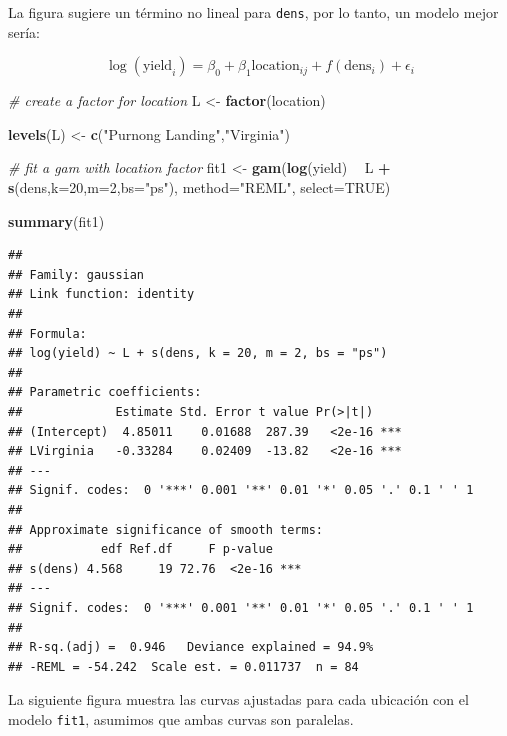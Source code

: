 \documentclass[]{book}
\newenvironment{Shaded}{\begin{snugshade}}{\end{snugshade}}
\newcommand{\KeywordTok}[1]{\textcolor[rgb]{0.13,0.29,0.53}{\textbf{#1}}}
\newcommand{\DataTypeTok}[1]{\textcolor[rgb]{0.13,0.29,0.53}{#1}}
\newcommand{\DecValTok}[1]{\textcolor[rgb]{0.00,0.00,0.81}{#1}}
\newcommand{\StringTok}[1]{\textcolor[rgb]{0.31,0.60,0.02}{#1}}
\newcommand{\CommentTok}[1]{\textcolor[rgb]{0.56,0.35,0.01}{\textit{#1}}}
\newcommand{\OtherTok}[1]{\textcolor[rgb]{0.56,0.35,0.01}{#1}}
\newcommand{\OperatorTok}[1]{\textcolor[rgb]{0.81,0.36,0.00}{\textbf{#1}}}
\newcommand{\NormalTok}[1]{#1}
\begin{document}
La figura sugiere un término no lineal para \texttt{dens}, por lo tanto,
un modelo mejor sería:

\[
\log(\text{yield}_i) = \beta_0 + \beta_1\text{location}_{ij} + f(\text{dens}_i) + \epsilon_i
\]

\begin{Shaded}
\begin{Highlighting}[]
\CommentTok{# create a factor for location}
\NormalTok{L <-}\StringTok{ }\KeywordTok{factor}\NormalTok{(location)}

\KeywordTok{levels}\NormalTok{(L) <-}\StringTok{ }\KeywordTok{c}\NormalTok{(}\StringTok{"Purnong Landing"}\NormalTok{,}\StringTok{"Virginia"}\NormalTok{)}

\CommentTok{# fit a gam with location factor}
\NormalTok{fit1 <-}\StringTok{ }\KeywordTok{gam}\NormalTok{(}\KeywordTok{log}\NormalTok{(yield) }\OperatorTok{~}\StringTok{ }\NormalTok{L }\OperatorTok{+}\StringTok{ }\KeywordTok{s}\NormalTok{(dens,}\DataTypeTok{k=}\DecValTok{20}\NormalTok{,}\DataTypeTok{m=}\DecValTok{2}\NormalTok{,}\DataTypeTok{bs=}\StringTok{"ps"}\NormalTok{),}
            \DataTypeTok{method=}\StringTok{"REML"}\NormalTok{, }\DataTypeTok{select=}\OtherTok{TRUE}\NormalTok{)}

\KeywordTok{summary}\NormalTok{(fit1)}
\end{Highlighting}
\end{Shaded}

\begin{verbatim}
## 
## Family: gaussian 
## Link function: identity 
## 
## Formula:
## log(yield) ~ L + s(dens, k = 20, m = 2, bs = "ps")
## 
## Parametric coefficients:
##             Estimate Std. Error t value Pr(>|t|)    
## (Intercept)  4.85011    0.01688  287.39   <2e-16 ***
## LVirginia   -0.33284    0.02409  -13.82   <2e-16 ***
## ---
## Signif. codes:  0 '***' 0.001 '**' 0.01 '*' 0.05 '.' 0.1 ' ' 1
## 
## Approximate significance of smooth terms:
##           edf Ref.df     F p-value    
## s(dens) 4.568     19 72.76  <2e-16 ***
## ---
## Signif. codes:  0 '***' 0.001 '**' 0.01 '*' 0.05 '.' 0.1 ' ' 1
## 
## R-sq.(adj) =  0.946   Deviance explained = 94.9%
## -REML = -54.242  Scale est. = 0.011737  n = 84
\end{verbatim}

La siguiente figura muestra las curvas ajustadas para cada ubicación con
el modelo \texttt{fit1}, asumimos que ambas curvas son paralelas.
\end{document}

